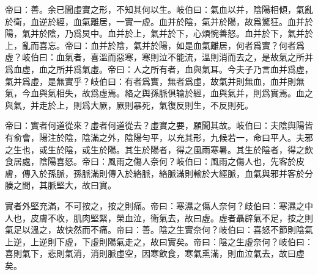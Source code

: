 \documentclass[draft,12pt]{ctexbook}
\begin{document}

\begin{yuanwen}
帝曰：善。余已聞虛實之形，不知其何以生。岐伯曰：氣血以并，陰陽相傾，氣亂於衛，血逆於經，血氣離居，一實一虛。血并於陰，氣并於陽，故爲驚狂。血并於陽，氣并於陰，乃爲炅中。血并於上，氣并於下，心煩惋善怒。血并於下，氣并於上，亂而喜忘。帝曰：血并於陰，氣并於陽，如是血氣離居，何者爲實？何者爲虛？岐伯曰：血氣者，喜溫而惡寒，寒則泣不能流，溫則消而去之，是故氣之所并爲血虛，血之所并爲氣虛。帝曰：人之所有者，血與氣耳。今夫子乃言血并爲虛，氣并爲虛，是無實乎？岐伯曰：有者爲實，無者爲虛，故氣并則無血，血并則無氣，今血與氣相失，故爲虛焉。絡之舆孫脈俱输於經，血與氣并，則爲實焉。血之與氣，并走於上，則爲大厥，厥則暴死，氣復反則生，不反則死。

帝曰：實者何道從來？虛者何道從去？虛實之要，願聞其故。岐伯曰：夫陰舆陽皆有俞會，陽注於陰，陰滿之外，陰陽勻平，以充其形，九候若一，命曰平人。夫邪之生也，或生於陰，或生於陽。其生於陽者，得之風雨寒暑。其生於陰者，得之飲食居處，陰陽喜怒。帝曰：風雨之傷人奈何？岐伯曰：風雨之傷人也，先客於皮膚，傳入於孫脈，孫脈滿則傳入於絡脈，絡脈滿則輸於大經脈，血氣與邪并客於分腠之間，其脈堅大，故曰實。

實者外堅充滿，不可按之，按之則痛。帝曰：寒濕之傷人奈何？歧伯曰：寒濕之中人也，皮膚不收，肌肉堅緊，榮血泣，衛氣去，故曰虛。虛者聶辟氣不足，按之則氣足以溫之，故快然而不痛。帝曰：善。陰之生實奈何？岐伯曰：喜怒不節則陰氣上逆，上逆則下虛，下虛則陽氣走之，故曰實矣。帝曰：陰之生虛奈何？岐伯曰：喜則氣下，悲則氣消，消則脈虛空，因寒飲食，寒氣熏滿，則血泣氣去，故曰虛矣。
\end{yuanwen}

\end{document}
